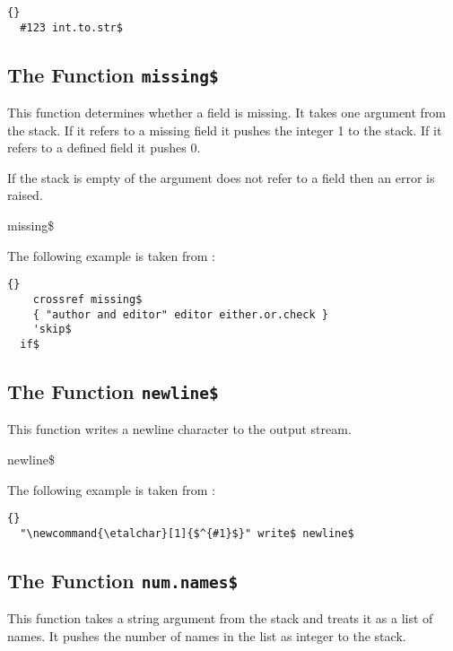 \begin{lstlisting}{}
  #123 int.to.str$
\end{lstlisting}


\subsection{The Function \texttt{missing\$}}%

This function determines whether a field is missing. It takes one
argument from the stack. If it refers to a missing field it pushes the
integer 1 to the stack. If it refers to a defined field it pushes 0.

If the stack is empty of the argument does not refer to a field then
an error is raised.
 
\begin{BstFunction}{missing\$}
\end{BstFunction}

The following example is taken from :

\begin{lstlisting}{}
    crossref missing$
    { "author and editor" editor either.or.check }
    'skip$
  if$
\end{lstlisting}


\subsection{The Function \texttt{newline\$}}%

This function writes a newline character to the output stream.

\begin{BstFunction}{newline\$}
\end{BstFunction}

The following example is taken from :

\begin{lstlisting}{}
  "\newcommand{\etalchar}[1]{$^{#1}$}" write$ newline$
\end{lstlisting}


\subsection{The Function \texttt{num.names\$}}%

This function takes a string argument from the stack and treats it as
a list of names. It pushes the number of names in the list as integer
to the stack.

